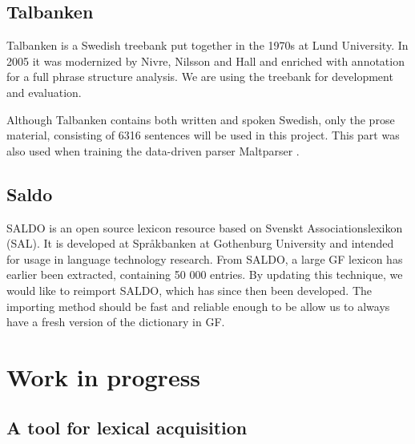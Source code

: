 \documentclass[submission]{eptcs} %
\begin{document}
\subsection{Talbanken}
Talbanken\cite{talbanken} is
a Swedish treebank put together in the 1970s at Lund University.
In 2005 it was modernized by Nivre, Nilsson and Hall\cite{talbanken05} and
enriched with annotation for a full phrase structure analysis. 
We are using the treebank for development and evaluation. 

Although Talbanken contains both written and spoken Swedish,
only the prose material, consisting of 6316 sentences will be used in this project.
This part was also used when training the data-driven parser Maltparser \cite{malt}. \\

\subsection{Saldo}
SALDO\cite{saldo} is an open source lexicon resource
based on Svenskt Associationslexikon (SAL). It is
developed at Språkbanken at Gothenburg University
and intended for usage in language technology
research. 
From SALDO, a large GF lexicon
has earlier been extracted,
containing 50 000 entries.
By updating this technique, we would like
to reimport SALDO, which has since then been developed.
The importing method should be fast and reliable
enough to be allow us to always have a fresh version of the dictionary
in GF.


\section{Work in progress}
\label{sec:progress}
\subsection{A tool for lexical acquisition}
\end{document}
